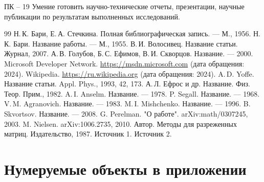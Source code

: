 \documentclass[bachelor, och, coursework]{SCWorks}
\begin{document}
ПК – 19 Умение готовить научно-технические отчеты, презентации, научные публикации по результатам выполненных исследований.




%

\begin{thebibliography}{99}
 Н.\,К. Бари, Е.\,А. Стечкина. Полная библиографическая запись. — М., 1956.
 Н.\,К. Бари. Название работы. — М., 1955.
 В.\,И. Волосивец. Название статьи. Журнал, 2007.
 А.\,В. Голубов, Б.\,С. Ефимов, В.\,И. Скворцов. Название. — 2000.
 Microsoft Developer Network. \url{https://msdn.microsoft.com} (дата обращения: 2024).
 Wikipedia. \url{https://ru.wikipedia.org} (дата обращения: 2024).
 A.\,D. Yoffe. Название статьи. Appl. Phys., 1993, 42, 173.
 А.\,Л. Ефрос и др. Название. Физ. Теор. Прим., 1982.
 A.\,I. Anselm. Название. — 1978.
 P. Segall. Название. — 1968.
 V.\,M. Agranovich. Название. — 1983.
 M.\,I. Mishchenko. Название. — 1996.
 B. Skvortsov. Название. — 2008.
 G. Perelman. "О работе". arXiv:math/0307245, 2003.
 M. Nielsen. arXiv:1006.2735, 2010.
 Автор. Методы для разреженных матриц. Издательство, 1987.
 Источник 1.
 Источник 2.
\end{thebibliography}

\appendix

\section{Нумеруемые объекты в приложении}
\end{document}
